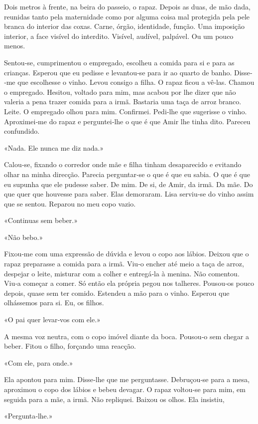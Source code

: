 Dois metros à frente, na beira do passeio, o rapaz. Depois as duas, de
mão dada, reunidas tanto pela maternidade como por alguma coisa mal
protegida pela pele branca do interior das coxas. Carne, órgão,
identidade, função. Uma imposição interior, a face visível do interdito.
Visível, audível, palpável. Ou um pouco menos.

Sentou­‑se, cumprimentou o empregado, escolheu a comida para si e para
as crianças. Esperou que eu pedisse e levantou­‑se para ir ao quarto de
banho. Disse­‑me que escolhesse o vinho. Levou consigo a filha. O rapaz
ficou a vê­‑las. Chamou o empregado. Hesitou, voltado para mim, mas
acabou por lhe dizer que não valeria a pena trazer comida para a irmã.
Bastaria uma taça de arroz branco. Leite. O empregado olhou para mim.
Confirmei. Pedi­‑lhe que sugerisse o vinho. Aproximei­‑me do rapaz e
perguntei­‑lhe o que é que Amir lhe tinha dito. Pareceu confundido.

«Nada. Ele nunca me diz nada.»

Calou­‑se, fixando o corredor onde mãe e filha tinham desaparecido e
evitando olhar na minha direcção. Parecia perguntar­‑se o que é que eu
sabia. O que é que eu supunha que ele pudesse saber. De mim. De si, de
Amir, da irmã. Da mãe. Do que quer que houvesse para saber. Elas
demoraram. Lisa serviu­‑se do vinho assim que se sentou. Reparou no meu
copo vazio.

«Continuas sem beber.»

«Não bebo.»

Fixou­‑me com uma expressão de dúvida e levou o copo aos lábios. Deixou
que o rapaz preparasse a comida para a irmã. Viu­‑o encher até meio a
taça de arroz, despejar o leite, misturar com a colher e entregá­‑la à
menina. Não comentou. Viu­‑a começar a comer. Só então ela própria pegou
nos talheres. Pousou­‑os pouco depois, quase sem ter comido. Estendeu a
mão para o vinho. Esperou que olhássemos para si. Eu, os filhos.

«O pai quer levar­‑vos com ele.»

A mesma voz neutra, com o copo imóvel diante da boca. Pousou­‑o sem
chegar a beber. Fitou o filho, forçando uma reacção.

«Com ele, para onde.»

Ela apontou para mim. Disse­‑lhe que me perguntasse. Debruçou­‑se para a
mesa, aproximou o copo dos lábios e bebeu devagar. O rapaz voltou­‑se
para mim, em seguida para a mãe, a irmã. Não repliquei. Baixou os olhos.
Ela insistiu,

«Pergunta­‑lhe.»

